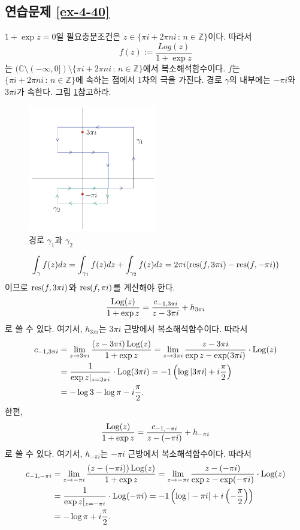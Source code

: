 \subsection*{연습문제 \ref{ex-4-40}}

$1+\exp z =0$일 필요충분조건은 $ z\in \{ \pi i +2\pi n i \,:\, n\in \mathbb Z\}$이다.
따라서
\[
f(z):= \dfrac{Log(z)}{1+\exp z}
\]
는 $(\mathbb C\setminus(-\infty,0])\setminus \{ \pi i +2\pi n i \,:\, n\in \mathbb Z\}$에서
복소해석함수이다.
$f$는 $\{ \pi i +2\pi n i \,:\, n\in \mathbb Z\}$에 속하는 점에서 $1$차의 극을 가진다.
경로 $\gamma$의 내부에는 $-\pi i$와  $3\pi i$가 속한다. 그림 \ref{fig-5-23}\을 참고하라.

\begin{figure}[h!]
\begin{center}
\includegraphics[width=0.5\textwidth]{./Solution/figs/fig-5-23}
\end{center}
\caption{경로 $\gamma_1$과 $\gamma_2$
}
\label{fig-5-23}
\end{figure}

\[
\int_\gamma f(z) dz = \int_{\gamma_1} f(z) dz + \int_{\gamma_2} f(z) dz
= 2\pi i (\mathop{\mathrm{res}}(f,3\pi i) - \mathop{\mathrm{res}}(f, -\pi i))
\]
이므로 $\mathop{\mathrm{res}}(f, 3\pi i)$와 $\mathop{\mathrm{res}}(f, \pi i)$를 계산해야 한다.
\[
\displaystyle\frac{\mathop{\mathrm{Log}}(z)}{1+\exp z} = \displaystyle\frac{c_{-1,3\pi i}}{z-3\pi i} + h_{3\pi i}
\]
로 쓸 수 있다. 여기서, $h_{3\pi i}$는 $3\pi i$ 근방에서 복소해석함수이다.
따라서
\begin{align*}
c_{-1,3\pi i}
&= \lim_{z\to 3\pi i} \displaystyle\frac{(z-3\pi i)\mathop{\mathrm{Log}}(z)}{1+\exp z} 
= \lim_{z\to 3\pi i} \displaystyle\frac{z-3\pi i}{\exp z - \exp(3\pi i)}\cdot \mathop{\mathrm{Log}}(z) \\
&= \displaystyle\frac1{\exp z|_{z=3\pi i}} \cdot \mathop{\mathrm{Log}}(3\pi i) = -1\left( \log|3\pi i| + i\displaystyle\frac\pi2 \right) \\
&= - \log 3 - \log\pi- i\displaystyle\frac\pi2.
\end{align*}
한편,
\[
\displaystyle\frac{\mathop{\mathrm{Log}}(z)}{1+\exp z} = \displaystyle\frac{c_{-1,-\pi i}}{z-(-\pi i)} + h_{-\pi i}
\]
로 쓸 수 있다. 여기서, $h_{-\pi i}$는 $-\pi i$ 근방에서 복소해석함수이다.
따라서
\begin{align*}
c_{-1,-\pi i}
&= \lim_{z\to -\pi i} \displaystyle\frac{(z-(-\pi i))\mathop{\mathrm{Log}}(z)}{1+\exp z} 
= \lim_{z\to -\pi i} \displaystyle\frac{z-(-\pi i)}{\exp z - \exp(-\pi i)}\cdot \mathop{\mathrm{Log}}(z) \\
&= \displaystyle\frac1{\exp z|_{z=-\pi i}} \cdot \mathop{\mathrm{Log}}(-\pi i) 
= -1\left( \log|-\pi i| + i\left(-\displaystyle\frac\pi2 \right)\right) \\
&= - \log\pi +  i\displaystyle\frac\pi2.
\end{align*}

